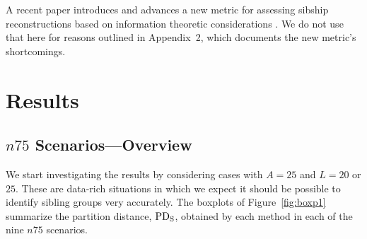 A recent paper introduces and advances a new metric for assessing sibship reconstructions based on 
information theoretic considerations \citep{BrownDexter2012}.  We do not use that here for reasons 
outlined in Appendix~2, which documents the new metric's shortcomings.

\section*{Results}
\subsection*{$n75$ Scenarios---Overview}
We start investigating the results by considering cases with $A=25$ and $L=20$ or $25$. These are 
data-rich situations in which we expect it should be possible to identify sibling groups very accurately.  
The boxplots of Figure~\ref{fig:boxp1} summarize the partition distance, $\mathrm{PD_S}$, obtained by each 
method in each of the nine $n75$ scenarios. 


